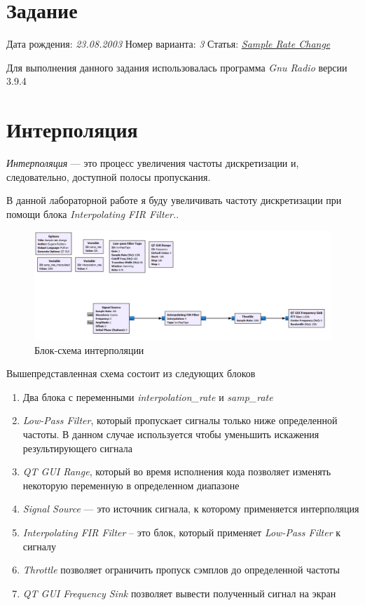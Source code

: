 \documentclass[12pt]{article}
\begin{document}
\begin{titlepage}
    
\end{titlepage}

\tableofcontents
\pagebreak

\section{Задание}
\begin{flushleft}
    Дата рождения: \textit{23.08.2003}\break
    Номер варианта: \textit{3} \break
    Статья: \textit{\href{https://wiki.gnuradio.org/index.php?title=Sample\_Rate\_Change}{Sample Rate Change}}
\end{flushleft}
Для выполнения данного задания использовалась программа \textit{Gnu Radio} версии 3.9.4

\section{Интерполяция}
\textit{Интерполяция} --- это процесс увеличения частоты дискретизации и, следовательно,
доступной полосы пропускания.

В данной лабораторной работе я буду увеличивать частоту дискретизации при помощи блока \textit{Interpolating FIR Filter.}.

\begin{figure}[H]
    \centering
    \includegraphics[width=1\textwidth]{images/inter-block.png}
    \caption{Блок-схема интерполяции}
\end{figure}

Вышепредставленная схема состоит из следующих блоков
\begin{enumerate}
    \item Два блока с переменными \textit{interpolation\_rate} и \textit{samp\_rate}
    \item \textit{Low-Pass Filter}, который пропускает сигналы только ниже определенной частоты. В данном случае используется
    чтобы уменьшить искажения результирующего сигнала
    \item \textit{QT GUI Range}, который во время исполнения кода позволяет изменять некоторую переменную в определенном диапазоне
    \item \textit{Signal Source} --- это источник сигнала, к которому применяется интерполяция
    \item \textit{Interpolating FIR Filter} -- это блок, который применяет \textit{Low-Pass Filter} к сигналу
    \item \textit{Throttle} позволяет ограничить пропуск сэмплов до определенной частоты
    \item \textit{QT GUI Frequency Sink} позволяет вывести полученный сигнал на экран
\end{enumerate}
\end{document}
